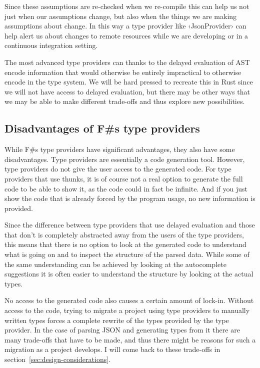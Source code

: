Since these assumptions are re-checked when we re-compile this can help us not just when our assumptions change, but also when the things we are making assumptions about change. In this way a type provider like ‹JsonProvider› can help alert us about changes to remote resources while we are developing or in a continuous  integration setting.

The most advanced type providers can thanks to the delayed evaluation of AST encode information that would otherwise be entirely impractical to otherwise encode in the type system. We will be hard pressed to recreate this in Rust since we will not have access to delayed evaluation, but there may be other ways that we may be able to make different trade-offs and thus explore new possibilities.

\subsection{Disadvantages of F\#s type providers}
\label{sec:disadvantages-of-type-providers}

While F\#s type providers have significant advantages, they also have some disadvantages. Type providers are essentially a code generation tool. However, type providers do not give the user access to the generated code. For type providers that use thunks, it is of course not a real option to generate the full code to be able to show it, as the  code could in fact be infinite. And if you just show the code that is already forced by the program usage, no new information is provided.


Since the difference between type providers that use delayed evaluation and those that don't is completely abstracted away from the users of the type providers, this means that there is no option to look at the generated code to understand what is going on and to inspect the structure of the parsed data. While some of the same understanding can be achieved by looking at the autocomplete suggestions it is often easier to understand the structure by looking at the actual types.


No access to the generated code also causes a certain amount of lock-in. Without access to the code, trying to migrate a project using type providers to manually written types forces a complete rewrite of the types provided by the type provider. In the case of parsing JSON and generating types from it there are many trade-offs that have to be made, and thus there might be reasons for such a migration as a project develops. I will come back to these trade-offs in section~\ref{sec:design-considerations}.

